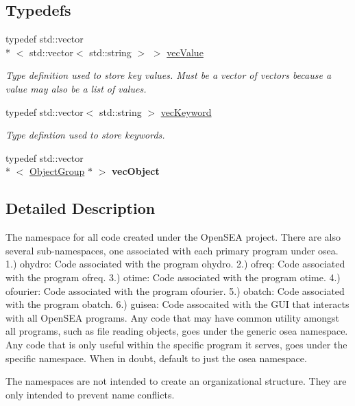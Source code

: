 \subsection*{Typedefs}
\begin{DoxyCompactItemize}
\item 
\hypertarget{namespaceosea_a32445ae8bddcf230ef3a16926ffd0f98}{typedef std\-::vector\\*
$<$ std\-::vector$<$ std\-::string $>$ $>$ \hyperlink{namespaceosea_a32445ae8bddcf230ef3a16926ffd0f98}{vec\-Value}}\label{namespaceosea_a32445ae8bddcf230ef3a16926ffd0f98}

\begin{DoxyCompactList}\small\item\em Type definition used to store key values. Must be a vector of vectors because a value may also be a list of values. \end{DoxyCompactList}\item 
\hypertarget{namespaceosea_a752ba1895c2932eda28076a8a467ae37}{typedef std\-::vector$<$ std\-::string $>$ \hyperlink{namespaceosea_a752ba1895c2932eda28076a8a467ae37}{vec\-Keyword}}\label{namespaceosea_a752ba1895c2932eda28076a8a467ae37}

\begin{DoxyCompactList}\small\item\em Type defintion used to store keywords. \end{DoxyCompactList}\item 
\hypertarget{namespaceosea_ab25fb67447fccb23f5683988d96d2dc2}{typedef std\-::vector\\*
$<$ \hyperlink{classosea_1_1_object_group}{Object\-Group} $\ast$ $>$ {\bfseries vec\-Object}}\label{namespaceosea_ab25fb67447fccb23f5683988d96d2dc2}

\end{DoxyCompactItemize}


\subsection{Detailed Description}
The namespace for all code created under the Open\-S\-E\-A project. There are also several sub-\/namespaces, one associated with each primary program under osea. 1.) ohydro\-: Code associated with the program ohydro. 2.) ofreq\-: Code associated with the program ofreq. 3.) otime\-: Code associated with the program otime. 4.) ofourier\-: Code associated with the program ofourier. 5.) obatch\-: Code associated with the program obatch. 6.) guisea\-: Code assocaited with the G\-U\-I that interacts with all Open\-S\-E\-A programs. Any code that may have common utility amongst all programs, such as file reading objects, goes under the generic osea namespace. Any code that is only useful within the specific program it serves, goes under the specific namespace. When in doubt, default to just the osea namespace.

The namespaces are not intended to create an organizational structure. They are only intended to prevent name conflicts. 